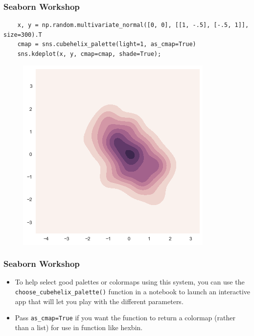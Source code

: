 \documentclass{beamer}
\begin{document}
\begin{frame}[fragile]
	\frametitle{Seaborn Workshop}
	\large
	
	\begin{verbatim}
	x, y = np.random.multivariate_normal([0, 0], [[1, -.5], [-.5, 1]], size=300).T
	cmap = sns.cubehelix_palette(light=1, as_cmap=True)
	sns.kdeplot(x, y, cmap=cmap, shade=True);
	\end{verbatim}
	\begin{figure}
		\centering
		\includegraphics[width=0.7\linewidth]{images/color_palettes_40_0}
	\end{figure}
	
\end{frame}
\begin{frame}[fragile]
	\frametitle{Seaborn Workshop}
	\large
	\begin{itemize}
		\item To help select good palettes or colormaps using this system, you can use the \texttt{choose\_cubehelix\_palette()} function in a notebook to launch an interactive app that will let you play with the different parameters. 
		\item Pass \texttt{as\_cmap=True} if you want the function to return a colormap (rather than a list) for use in function like hexbin.
	\end{itemize}
	
\end{frame}
\end{document}
